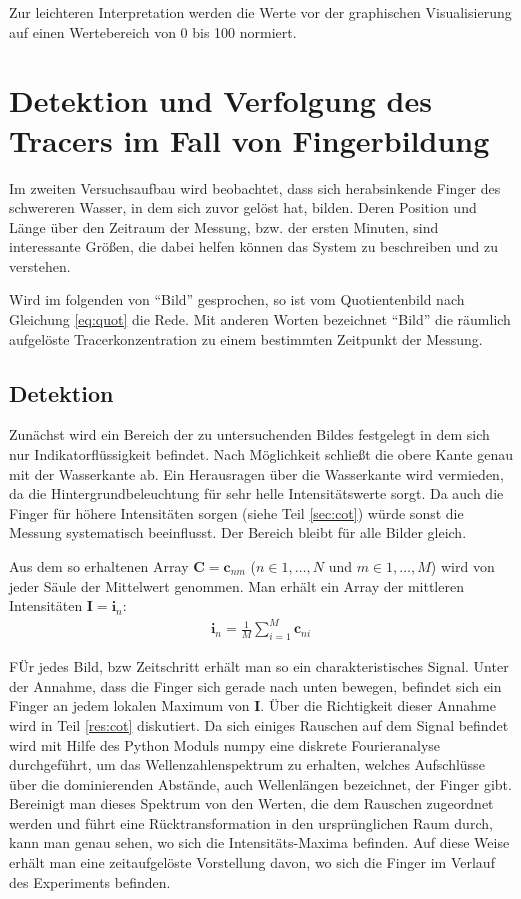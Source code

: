 Zur leichteren Interpretation werden die Werte vor der graphischen Visualisierung auf einen Wertebereich von 0 bis 100 normiert.

\section{Detektion und Verfolgung des Tracers im Fall von Fingerbildung}
\label{sec:track}
Im zweiten Versuchsaufbau wird beobachtet, dass sich herabsinkende Finger des schwereren Wasser, in dem sich zuvor \COT gelöst hat, bilden. Deren Position und Länge über den Zeitraum der Messung, bzw. der ersten Minuten, sind interessante Größen, die dabei helfen können das System zu beschreiben und zu verstehen.

Wird im folgenden von ``Bild'' gesprochen, so ist vom Quotientenbild nach Gleichung \ref{eq:quot} die Rede. Mit anderen Worten bezeichnet ``Bild'' die räumlich aufgelöste Tracerkonzentration zu einem bestimmten Zeitpunkt der Messung.

\subsection{Detektion}
\label{sec:dec}
Zunächst wird ein Bereich der zu untersuchenden Bildes festgelegt in dem sich nur Indikatorflüssigkeit befindet. Nach Möglichkeit schließt die obere Kante genau mit der Wasserkante ab. Ein Herausragen über die Wasserkante wird vermieden, da die Hintergrundbeleuchtung für sehr helle Intensitätswerte sorgt. Da auch die Finger für höhere Intensitäten sorgen (siehe Teil \ref{sec:cot}) würde sonst die Messung systematisch beeinflusst. Der Bereich bleibt für alle Bilder gleich.

Aus dem so erhaltenen Array $\mathbf{C} = \mathbf{c}_{nm}$ ($n \in 1,\dots,N$ und $m \in 1,\dots,M$) wird von jeder Säule der Mittelwert genommen. Man erhält ein Array der mittleren Intensitäten $\mathbf{I} = \mathbf{i}_{n}$:
\begin{eqnarray}
 \mathbf{i}_{n} = \frac{1}{M} \sum_{i=1}^{M} \mathbf{c}_{ni}
\end{eqnarray}

FÜr jedes Bild, bzw Zeitschritt erhält man so ein charakteristisches Signal. Unter der Annahme, dass die Finger sich gerade nach unten bewegen, befindet sich ein Finger an jedem lokalen Maximum von $\mathbf{I}$. Über die Richtigkeit dieser Annahme wird in Teil \ref{res:cot} diskutiert.
Da sich einiges Rauschen auf dem Signal befindet wird mit Hilfe des Python Moduls numpy eine diskrete Fourieranalyse durchgeführt, um das Wellenzahlenspektrum zu erhalten, welches Aufschlüsse über die dominierenden Abstände, auch Wellenlängen bezeichnet, der Finger gibt. Bereinigt man dieses Spektrum von den Werten, die dem Rauschen zugeordnet werden und führt eine Rücktransformation in den ursprünglichen Raum durch, kann man genau sehen, wo sich die Intensitäts-Maxima befinden. Auf diese Weise erhält man eine zeitaufgelöste Vorstellung davon, wo sich die Finger im Verlauf des Experiments befinden.

